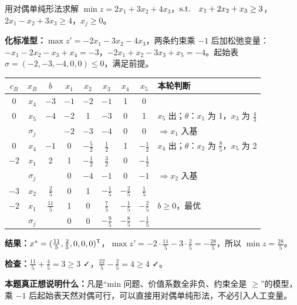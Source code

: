 \begin{examplebox}
用对偶单纯形法求解 $\min z=2x_1+3x_2+4x_3$，$\text{s.t.}\quad x_1+2x_2+x_3\ge3$，$2x_1-x_2+3x_3\ge4$，$x_j\ge0$。\par
\textbf{化标准型：}$\max z'=-2x_1-3x_2-4x_3$，两条约束乘 $-1$ 后加松弛变量：$-x_1-2x_2-x_3+x_4=-3$，$-2x_1+x_2-3x_3+x_5=-4$。起始表 $\sigma=(-2,-3,-4,0,0)\le0$，满足前提。

\begin{center}\small
\begin{tabular}{@{}ccc|ccccc|l@{}}
\toprule
$c_B$ & $x_B$ & $b$ & $x_1$ & $x_2$ & $x_3$ & $x_4$ & $x_5$ & 本轮判断\\\midrule
0 & $x_4$ & $-3$ & $-1$ & $-2$ & $-1$ & 1 & 0 & \\
0 & $x_5$ & \cellcolor{lightred}$-4$ & \cellcolor{shiftc!30}$-2$ & 1 & $-3$ & 0 & 1 & $x_5$ 出；$\theta$：$x_1$ 为 1，$x_3$ 为 $\frac43$\\\midrule
\multicolumn{3}{c|}{$\sigma_j$} & $-2$ & $-3$ & $-4$ & 0 & 0 & $\Rightarrow x_1$ 入基\\\midrule
0 & $x_4$ & \cellcolor{lightred}$-1$ & 0 & \cellcolor{shiftc!30}$-\frac52$ & $\frac12$ & 1 & $-\frac12$ & $x_4$ 出；$\theta$：$x_2$ 为 $\frac85$，$x_5$ 为 2\\
$-2$ & $x_1$ & 2 & 1 & $-\frac12$ & $\frac32$ & 0 & $-\frac12$ & \\\midrule
\multicolumn{3}{c|}{$\sigma_j$} & 0 & $-4$ & $-1$ & 0 & $-1$ & $\Rightarrow x_2$ 入基\\\midrule
$-3$ & $x_2$ & $\frac25$ & 0 & 1 & $-\frac15$ & $-\frac25$ & $\frac15$ & \\
$-2$ & $x_1$ & $\frac{11}{5}$ & 1 & 0 & $\frac75$ & $-\frac15$ & $-\frac25$ & $b\ge0$，最优\\\midrule
\multicolumn{3}{c|}{$\sigma_j$} & 0 & 0 & $-\frac95$ & $-\frac85$ & $-\frac15$ & \\\bottomrule
\end{tabular}
\end{center}
\textbf{结果：}$x^*=(\frac{11}{5},\frac25,0,0,0)^{\mathsf T}$，$\max z'=-2\cdot\frac{11}{5}-3\cdot\frac25=-\frac{28}{5}$，所以 $\min z=\frac{28}{5}$。\par
\textbf{检查：}$\frac{11}{5}+\frac45=3\ge3$ ✓，$\frac{22}{5}-\frac25=4\ge4$ ✓。\par
\textbf{本题真正想说明什么：}凡是“min 问题、价值系数全非负、约束全是 $\ge$”的模型，乘 $-1$ 后起始表天然对偶可行，可以直接用对偶单纯形法，不必引入人工变量。
\end{examplebox}

